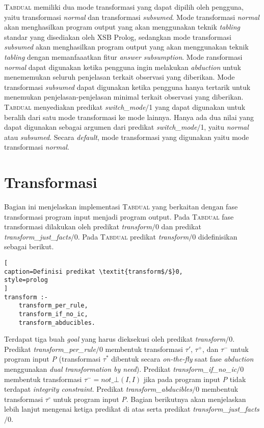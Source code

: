 \textsc{Tabdual} memiliki dua mode transformasi yang dapat dipilih oleh pengguna, yaitu transformasi \textit{normal} dan transformasi \textit{subsumed}. Mode transformasi \textit{normal} akan menghasilkan program output yang akan menggunakan teknik \textit{tabling} standar yang disediakan oleh XSB Prolog, sedangkan mode transformasi \textit{subsumed} akan menghasilkan program output yang akan menggunakan teknik \textit{tabling} dengan memanfaaatkan fitur \textit{answer subsumption}. Mode ransformasi \textit{normal} dapat digunakan ketika pengguna ingin melakukan \textit{abduction} untuk menememukan seluruh penjelasan terkait observasi yang diberikan. Mode transformasi \textit{subsumed} dapat digunakan ketika pengguna hanya tertarik untuk menemukan penjelasan-penjelasan minimal terkait observasi yang diberikan. \textsc{Tabdual} menyediakan predikat \textit{switch\_mode$/$}1 yang dapat digunakan untuk beralih dari satu mode transformasi ke mode lainnya. Hanya ada dua nilai yang dapat digunakan sebagai argumen dari predikat \textit{switch\_mode$/$}1, yaitu \textit{normal} atau \textit{subsumed}. Secara \textit{default}, mode transformasi yang digunakan yaitu mode transformasi \textit{normal}.

\section{Transformasi}
\label{transform}

Bagian ini menjelaskan implementasi \textsc{Tabdual} yang berkaitan dengan fase transformasi program input menjadi program output. Pada \textsc{Tabdual} fase transformasi dilakukan oleh predikat \textit{transform$/$}0 dan predikat \textit{transform\_just\_facts$/$}0. Pada \textsc{Tabdual} predikat \textit{transform$/$}0 didefinisikan sebagai berikut.
\\

\begin{lstlisting}[
caption=Definisi predikat \textit{transform$/$}0,
style=prolog
]
transform :- 
	transform_per_rule,
	transform_if_no_ic,
	transform_abducibles.
\end{lstlisting}

Terdapat tiga buah \textit{goal} yang harus dieksekusi oleh predikat \textit{transform$/$}0. Predikat \textit{transform\_per\_rule$/$}0 membentuk transformasi $\tau'$, $\tau^+$, dan $\tau^-$ untuk program input \textit{P} (transformasi $\tau^*$  dibentuk secara \textit{on-the-fly} saat fase \textit{abduction} menggunakan \textit{dual transformation by need}). Predikat \textit{transform\_if\_no\_ic$/$}0 membentuk transformasi $\tau^- = \textit{not}\_\bot(\textit{I},\textit{I})$ jika pada program input \textit{P} tidak terdapat \textit{integrity constraint}. Predikat \textit{transform\_abducibles$/$}0 membentuk transformasi $\tau^\circ$ untuk program input \textit{P}. Bagian berikutnya akan menjelaskan lebih lanjut mengenai ketiga predikat di atas serta predikat \textit{transform\_just\_facts$/$}0.

